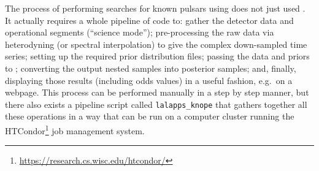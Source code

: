 The process of performing searches for known pulsars using does not just used \lppen. It actually requires a whole pipeline of code to: gather the \gw detector
data and operational segments (``science mode'');  pre-processing the raw data via heterodyning (or spectral interpolation) to give the complex down-sampled
time series; setting up the required prior distribution files; passing the data and priors to \lppen; converting the output nested samples into posterior samples;
and, finally, displaying those results (including odds values) in a useful fashion, e.g.\ on a webpage. This process can be performed manually in a step by step
manner, but there also exists a pipeline script called {\tt lalapps\_knope} that gathers together all these operations in a way that can be run on a computer
cluster running the HTCondor\footnote{\url{https://research.cs.wisc.edu/htcondor/}} job management system.

